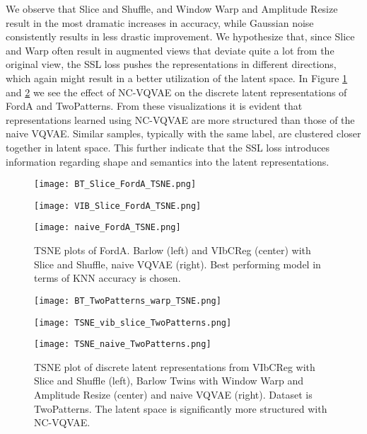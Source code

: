 \documentclass[../../thesis.tex]{subfiles}
\begin{document}
We observe that Slice and Shuffle, and Window Warp and Amplitude Resize result in the most dramatic increases in accuracy, while Gaussian noise consistently results in less drastic improvement. We hypothesize that, since Slice and Warp often result in augmented views that deviate quite a lot from the original view, the SSL loss pushes the representations in different directions, which again might result in a better utilization of the latent space. In Figure \ref{fig:FordA_TSNE} and \ref{fig:TSNE_TwoPatterns} we see the effect of NC-VQVAE on the discrete latent representations of FordA and TwoPatterns. From these visualizations it is evident that representations learned using NC-VQVAE are more structured than those of the naive VQVAE. Similar samples, typically with the same label, are clustered closer together in latent space. This further indicate that the SSL loss introduces information regarding shape and semantics into the latent representations.\newline

\begin{figure}[h] 
    \centering
    \begin{minipage}[b]{0.32\textwidth}
        \centering
        \texttt{[image: BT\_Slice\_FordA\_TSNE.png]}
    \end{minipage}
    \hfill
    \begin{minipage}[b]{0.32\textwidth}
        \centering
        \texttt{[image: VIB\_Slice\_FordA\_TSNE.png]}
    \end{minipage}
    \hfill
    \begin{minipage}[b]{0.32\textwidth}
        \centering
        \texttt{[image: naive\_FordA\_TSNE.png]}
    \end{minipage}
    \caption{TSNE plots of FordA. Barlow (left) and VIbCReg (center) with Slice and Shuffle, naive VQVAE (right). Best performing model in terms of KNN accuracy is chosen. }
    \label{fig:FordA_TSNE}
\end{figure}


\begin{figure}[h]
    \centering
    \begin{minipage}[b]{0.32\textwidth}
        \centering
        \texttt{[image: BT\_TwoPatterns\_warp\_TSNE.png]}
    \end{minipage}
    \hfill
    \begin{minipage}[b]{0.32\textwidth}
        \centering
        \texttt{[image: TSNE\_vib\_slice\_TwoPatterns.png]}
    \end{minipage}
    \hfill
    \begin{minipage}[b]{0.32\textwidth}
        \centering
        \texttt{[image: TSNE\_naive\_TwoPatterns.png]}
    \end{minipage}
    \caption{TSNE plot of discrete latent representations from VIbCReg with Slice and Shuffle (left), Barlow Twins with Window Warp and Amplitude Resize (center) and naive VQVAE (right). Dataset is TwoPatterns. The latent space is significantly more structured with NC-VQVAE.}
    \label{fig:TSNE_TwoPatterns}
\end{figure}
\end{document}
